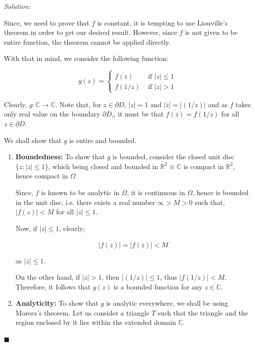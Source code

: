 \documentclass[12pt]{article}
\newcommand{\R}{\mathbb{R}}
\newcommand{\C}{\mathbb{C}}
\theoremstyle{definition}
\newenvironment{answer}{\textit{Solution: }\quad }{ \hfill $\blacksquare$}
\numberwithin{equation}{section}
\begin{document}
\begin{answer}
	
	Since, we need to prove that $f$ is constant, it is tempting to use Liouville's theorem in order to get our desired result. However, since $f$ is not given to be entire function, the theorem cannot be applied directly.

	With that in mind, we consider the following function:

	$$
	g(z) = \begin{cases}
		\overline{f(\overline{z})} & \text{ if } \vert z \vert \leq 1\\
		f(1/z) & \text{ if } \vert z \vert > 1
	\end{cases}
	$$

	Clearly, $g : \C \rightarrow \C$. Note that, for $z \in \partial D$, $\vert z \vert = 1$ and $\vert \overline{z} \vert = \vert (1/z) \vert$ and as $f$ takes only real value on the boundary $\partial D$,, it must be that $\overline{f(\overline{z})} = f(1/z)$ for all $z \in \partial D$.
	
	
	We shall show that $g$ is entire and bounded.

	\begin{enumerate}
		\item \textbf{Boundedness:} To show that $g$ is bounded, consider the closed unit disc $\{ z : \vert z \vert \leq 1 \}$, which being closed and bounded in $\R^2 \equiv \C$ is compact in $\R^2$, hence compact in $\Omega$. 
		
		Since, $f$ is known to be analytic in $\Omega$, it is continuous in $\Omega$, hence is bounded in the unit disc, i.e. there exists a real number $\infty > M > 0$ such that, $\vert f(z) \vert < M$ for all $\vert z \vert \leq 1$.

		Now, if $\vert z \vert \leq 1$, clearly;

		$$\vert \overline{f(\overline{z})} \vert = \vert f(\overline{z}) \vert < M$$
		
		as $\vert \overline{z} \vert \leq 1$.

		On the other hand, if $\vert z \vert > 1$, then $\vert (1/z) \vert \leq 1$, thus $\vert f(1/z) \vert < M$. Therefore, it follows that $g(z)$ is a bounded function for any $z \in \C$.

		\item \textbf{Analyticity: } To show that $g$ is analytic everywhere, we shall be using Morera's theorem. Let us consider a triangle $T$ such that the triangle and the region enclosed by it lies within the extended domain $\C$. 
		

\end{enumerate}
\end{answer}
\end{document}
